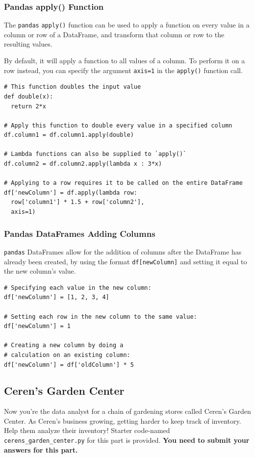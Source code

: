 \documentclass[a4paper]{article}
\begin{document}
\subsubsection{Pandas apply() Function}
The \texttt{pandas} \texttt{apply()} function can be used to apply a function on every value in a column or row of a DataFrame, and transform that column or row to the resulting values.

By default, it will apply a function to all values of a column. To perform it on a row instead, you can specify the argument \texttt{axis=1} in the \texttt{apply()} function call.

\begin{lstlisting}
# This function doubles the input value
def double(x):
  return 2*x

# Apply this function to double every value in a specified column
df.column1 = df.column1.apply(double)

# Lambda functions can also be supplied to `apply()`
df.column2 = df.column2.apply(lambda x : 3*x)

# Applying to a row requires it to be called on the entire DataFrame
df['newColumn'] = df.apply(lambda row: 
  row['column1'] * 1.5 + row['column2'],
  axis=1)
\end{lstlisting}{}

\subsubsection{Pandas DataFrames Adding Columns}
\texttt{pandas} DataFrames allow for the addition of columns after the DataFrame has already been created, by using the format \texttt{df[\textquotesingle newColumn\textquotesingle]} and setting it equal to the new column’s value.

\begin{lstlisting}
# Specifying each value in the new column:
df['newColumn'] = [1, 2, 3, 4]

# Setting each row in the new column to the same value:
df['newColumn'] = 1

# Creating a new column by doing a 
# calculation on an existing column:
df['newColumn'] = df['oldColumn'] * 5
\end{lstlisting}{}

\subsection{Ceren's Garden Center}
Now you’re the data analyst for a chain of gardening stores called Ceren's Garden Center. As Ceren's business growing, getting harder to keep track of inventory. Help them analyze their inventory! Starter code-named \texttt{cerens\_garden\_center.py} for this part is provided. \textbf{You need to submit your answers for this part.}
\end{document}
